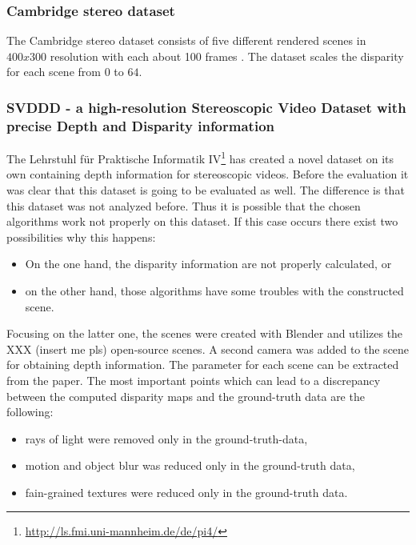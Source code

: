
\subsubsection{Cambridge stereo dataset}

The Cambridge stereo dataset consists of five different rendered scenes in $400x300$ resolution with each about 100 frames \citep{richardt2010real}.
The dataset scales the disparity for each scene from $0$ to $64$.

\subsubsection{SVDDD - a high-resolution Stereoscopic Video Dataset with precise Depth and Disparity information}

The Lehrstuhl f{\"u}r Praktische Informatik IV\footnote{\url{http://ls.fmi.uni-mannheim.de/de/pi4/}} has created a novel dataset on its own containing depth information for stereoscopic videos.
Before the evaluation it was clear that this dataset is going to be evaluated as well.
The difference is that this dataset was not analyzed before.
Thus it is possible that the chosen algorithms work not properly on this dataset.
If this case occurs there exist two possibilities why this happens:

\begin{itemize}
  \item On the one hand, the disparity information are not properly calculated, or
  \item on the other hand, those algorithms have some troubles with the constructed scene.
\end{itemize}

\noindent Focusing on the latter one, the scenes were created with Blender and utilizes the XXX (insert me pls) open-source scenes.
A second camera was added to the scene for obtaining depth information.
The parameter for each scene can be extracted from the paper.
The most important points which can lead to a discrepancy between the computed disparity maps and the ground-truth data are the following:

\begin{itemize}
  \item rays of light were removed only in the ground-truth-data,
  \item motion and object blur was reduced only in the ground-truth data,
  \item fain-grained textures were reduced only in the ground-truth data.
\end{itemize}

